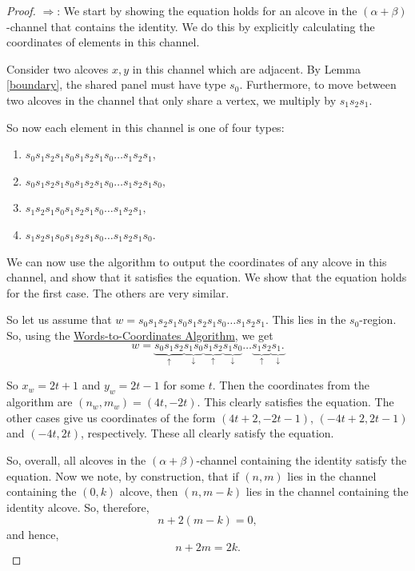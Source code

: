 \documentclass[11pt]{article}
\begin{document}
\begin{proof}
    $\Rightarrow$: We start by showing the equation holds for an alcove in the $(\alpha+\beta)$-channel that contains the identity. We do this by explicitly calculating the coordinates of elements in this channel.

    Consider two alcoves $x,y$ in this channel which are adjacent. By Lemma \ref{boundary}, the shared panel must have type $s_0$. Furthermore, to move between two alcoves in the channel that only share a vertex, we multiply by $s_1s_2s_1$.

\begin{center}
\resizebox{0.4\textwidth}{!}{}
\end{center}
    
    
    So now each element in this channel is one of four types:
    \begin{enumerate}
        \item $s_0s_1s_2s_1s_0s_1s_2s_1s_0\hdots s_1s_2s_1, $
        \item $s_0s_1s_2s_1s_0s_1s_2s_1s_0\hdots s_1s_2s_1s_0, $
        \item $s_1s_2s_1s_0s_1s_2s_1s_0\hdots s_1s_2s_1, $
        \item $s_1s_2s_1s_0s_1s_2s_1s_0\hdots s_1s_2s_1s_0. $
    \end{enumerate}
    We can now use the algorithm to output the coordinates of any alcove in this channel, and show that it satisfies the equation. We show that the equation holds for the first case. The others are very similar.
    
     So let us assume that $w=s_0s_1s_2s_1s_0s_1s_2s_1s_0\hdots s_1s_2s_1. $ This lies in the $s_0$-region. So, using the \hyperref[algorithm]{Words-to-Coordinates Algorithm}, we get 
    \[w=\underbrace{s_0s_1s_2}_\uparrow\underbrace{s_1s_0}_\downarrow \underbrace{s_1s_2}_\uparrow\underbrace{s_1s_0}_\downarrow\hdots \underbrace{s_1s_2}_\uparrow\underbrace{s_1.}_\downarrow\]

    So $x_w=2t+1$ and $y_w=2t-1$ for some $t$. Then the coordinates from the algorithm are $(n_w,m_w)=(4t,-2t)$. This clearly satisfies the equation. The other cases give us coordinates of the form $(4t+2,-2t-1)$, $(-4t+2,2t-1)$ and $(-4t,2t)$, respectively. These all clearly satisfy the equation.

    
    So, overall, all alcoves in the $(\alpha+\beta)$-channel containing the identity satisfy the equation. Now we note, by construction, that if $(n,m)$ lies in the channel containing the $(0,k)$ alcove, then $(n,m-k)$ lies in the channel containing the identity alcove. So, therefore,
    \[n+2(m-k)=0,\]
    and hence,
    \[n+2m=2k.\]


\end{proof}
\end{document}
